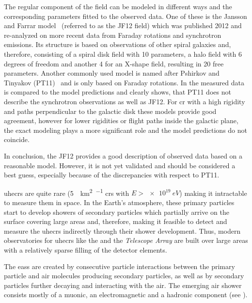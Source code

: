 The regular component of the field can be modeled in different ways and the corresponding parameters fitted to the observed data. One of these is the Jansson and Farrar model~\cite{Jansson2012} (referred to as the JF12 field) which was published 2012 and re-analyzed on more recent data from Faraday rotations and synchrotron emissions. Its structure is based on observations of other spiral galaxies and, therefore, consisting of a spiral disk field with 10 parameters, a halo field with 6 degrees of freedom and another 4 for an X-shape field, resulting in 20 free parameters. Another commonly used model is named after Pshirkov and Tinyakov (PT11)~\cite{Pshirkov2011} and is only based on Faraday rotations. In  the measured data is compared to the model predictions and clearly shows, that PT11 does not describe the synchrotron observations as well as JF12. For \gls{cr} with a high rigidity and paths perpendicular to the galactic disk these models provide good agreement, however for lower rigidities or flight paths inside the galactic plane, the exact modeling plays a more significant role and the model predictions do not coincide.

In conclusion, the JF12 provides a good description of observed data based on a reasonable model. However, it is not yet validated and should be considered a best guess, especially because of the discrepancies with respect to PT11.


\glspl{uhecr} are quite rare (\SI{5}{\per\square\kilo\meter\per\annum} \glspl{cr} with \(E > \SI{e19}{eV}\)) making it intractable to measure them in space. In the Earth's atmosphere, these primary particles start to develop showers of secondary particles which partially arrive on the surface covering large areas and, therefore, making it feasible to detect and measure the \glspl{uhecr} indirectly through their shower development. Thus, modern observatories for \glspl{uhecr} like the \pao{} and the \emph{Telescope Array} are built over large areas with a relatively sparse filling of the detector elements.

The \glspl{eas} are created by consecutive particle interactions between the primary particle and air molecules producing secondary particles, as well as by secondary particles further decaying and interacting with the air. The emerging air shower consists mostly of a muonic, an electromagnetic and a hadronic component (see ).

